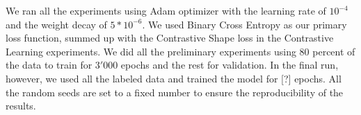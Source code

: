 We ran all the experiments using Adam optimizer with the learning rate of $10^{-4}$ and the weight decay of $5*10^{-6}$. We used Binary Cross Entropy as our primary loss function, summed up with the Contrastive Shape loss in the Contrastive Learning experiments.  We did all the preliminary experiments using 80 percent of the data to train for $3'000$ epochs and the rest for validation. In the final run, however, we used all the labeled data and trained the model for [?] epochs. All the random seeds are set to a fixed number to ensure the reproducibility of the results.